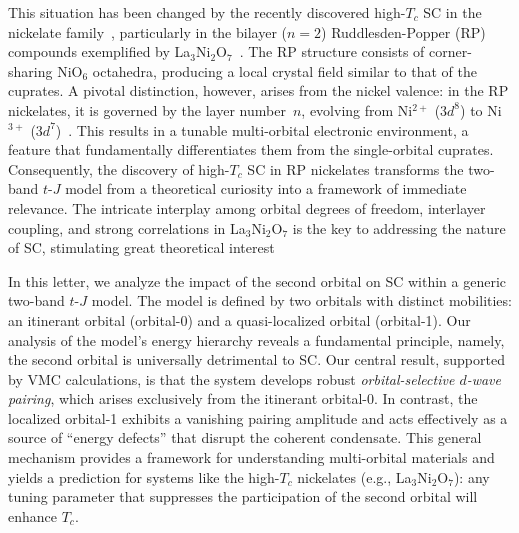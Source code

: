 \documentclass[reprint,superscriptaddress,amsmath,amssymb,aps,twocolumn]{revtex4-1}
\begin{document}
This situation has been changed by the recently discovered high-$T_c$ SC in the nickelate family~\cite{2019Hwang, 2023Wangc, 2025Hwangc, chengjg_crystal, 2025Chenb, 2024Zhaoa, 2025Qi, 2024Xiangb, 2025Chene}, particularly in the bilayer ($n=2$) Ruddlesden-Popper (RP) compounds exemplified by La$_3$Ni$_2$O$_7$~\cite{2023Wangc, 2025Hwangc, chengjg_crystal, 2025Chenb, chengjg_poly, 2024Yuan,  2024Feng, 2024Chenc, 2024Mathon,  2025Wangi, 2025Wangg, 2025Wang, 2025Maoa, 2025Hwang, 2025Hwanga, 2025Hwangb, 2025Shen, 2025Xuea, 2025Zhanga, 2025Chenc, 2025He, 2025Wangd,  2025Nie, 2025Niea, 2025Tsukazaki}. The RP structure consists of corner-sharing NiO$_6$ octahedra, producing a local crystal field similar to that of the cuprates. A pivotal distinction, however, arises from the nickel valence: in the RP nickelates, it is governed by the layer number~$n$, evolving from Ni$^{2+}$ ($3d^8$) to Ni$^{3+}$ ($3d^7$)~\cite{2023Wangc,2025Hwangc,2025Chene}. This results in a tunable multi-orbital electronic environment, a feature that fundamentally differentiates them from the single-orbital cuprates. Consequently, the discovery of high-$T_c$ SC in RP nickelates transforms the two-band $t$-$J$ model from a theoretical curiosity into a framework of immediate relevance. The intricate interplay among orbital degrees of freedom, interlayer coupling, and strong correlations in La$_3$Ni$_2$O$_7$ is the key to addressing the nature of SC, stimulating great theoretical interest~\cite{2023Yao,
2023Wangd, 2023Zhango, 2023Yangb, 2023Eremin, 2023Si, 2024Zhangf, 2025Xianga, 2024Wua, 2024Kurokia, GangSu_PhysRevLett.132.036502, 2024Wangi, 2024Wehling, 2024Hub-dft, 2024Hirschfelda, 2025Jiang-dft, 2025Hua-dft, 2025Wangl, 2025Hua, 2025Hug, 2025Zhange, 2025Zhangh, 2025Li, 2025Chen, 2025Kuroki, 2025Chaloupka, 2026Kontani, 2026Raghu, 2026Jiang}

In this letter, we analyze the impact of the second orbital on SC within a generic two-band $t$-$J$ model. The model is defined by two orbitals with distinct mobilities: an itinerant orbital (orbital-0) and a quasi-localized orbital (orbital-1). Our analysis of the model's energy hierarchy reveals a fundamental principle, namely, the second orbital is universally detrimental to SC. Our central result, supported by VMC calculations, is that the system develops robust {\em orbital-selective $d$-wave pairing}, which arises exclusively from the itinerant orbital-0. In contrast, the localized orbital-1 exhibits a vanishing pairing amplitude and acts effectively as a source of ``energy defects'' that disrupt the coherent condensate. This general mechanism provides a framework for understanding multi-orbital materials and yields a prediction for systems like the high-$T_c$ nickelates (e.g., La$_3$Ni$_2$O$_7$): any tuning parameter that suppresses the participation of the second orbital will enhance $T_c$.
\end{document}
